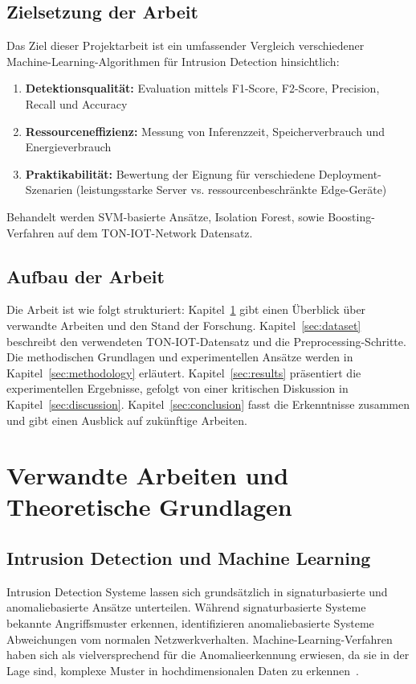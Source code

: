\documentclass[12pt,oneside]{article}
\begin{document}
	\subsection{Zielsetzung der Arbeit}
	Das Ziel dieser Projektarbeit ist ein umfassender Vergleich verschiedener Machine-Learning-Algorithmen für Intrusion Detection hinsichtlich:
	\begin{enumerate}
		\item \textbf{Detektionsqualität:} Evaluation mittels F1-Score, F2-Score, Precision, Recall und Accuracy
		\item \textbf{Ressourceneffizienz:} Messung von Inferenzzeit, Speicherverbrauch und Energieverbrauch
		\item \textbf{Praktikabilität:} Bewertung der Eignung für verschiedene Deployment-Szenarien (leistungsstarke Server vs. ressourcenbeschränkte Edge-Geräte)
	\end{enumerate}
	Behandelt werden SVM-basierte Ansätze, Isolation Forest, sowie Boosting-Verfahren auf dem TON-IOT-Network Datensatz.
	\subsection{Aufbau der Arbeit}
	Die Arbeit ist wie folgt strukturiert: Kapitel~\ref{sec:related} gibt einen Überblick über verwandte Arbeiten und den Stand der Forschung. Kapitel~\ref{sec:dataset} beschreibt den verwendeten TON-IOT-Datensatz und die Preprocessing-Schritte. Die methodischen Grundlagen und experimentellen Ansätze werden in Kapitel~\ref{sec:methodology} erläutert. Kapitel~\ref{sec:results} präsentiert die experimentellen Ergebnisse, gefolgt von einer kritischen Diskussion in Kapitel~\ref{sec:discussion}. Kapitel~\ref{sec:conclusion} fasst die Erkenntnisse zusammen und gibt einen Ausblick auf zukünftige Arbeiten.
	
	\section{Verwandte Arbeiten und Theoretische Grundlagen}
	\label{sec:related}
	\subsection{Intrusion Detection und Machine Learning}
	Intrusion Detection Systeme lassen sich grundsätzlich in signaturbasierte und anomaliebasierte Ansätze unterteilen. Während signaturbasierte Systeme bekannte Angriffsmuster erkennen, identifizieren anomaliebasierte Systeme Abweichungen vom normalen Netzwerkverhalten. Machine-Learning-Verfahren haben sich als vielversprechend für die Anomalieerkennung erwiesen, da sie in der Lage sind, komplexe Muster in hochdimensionalen Daten zu erkennen~\cite{li2024}.
\end{document}
